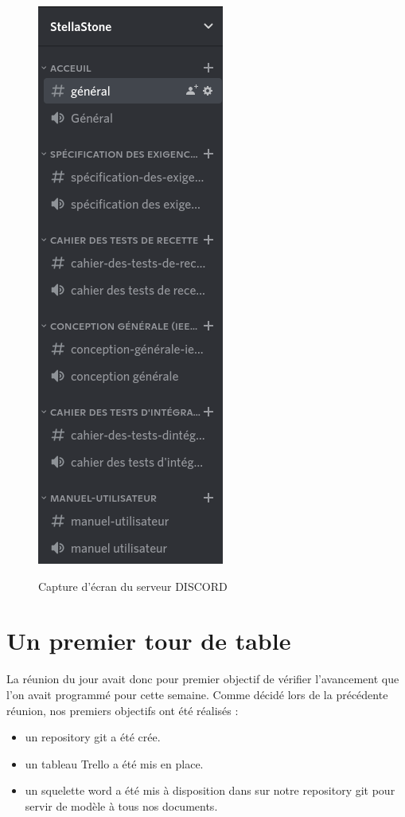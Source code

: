 \documentclass[a4paper, 12pt]{article}
\begin{document}
 \begin{figure}[!h]
    \centering
    \includegraphics[scale=0.5]{discord.png}
    \label{fig:Le_planning}
    \caption{Capture d'écran du serveur DISCORD}
\end{figure}

\section{Un premier tour de table}

La réunion du jour avait donc pour premier objectif de vérifier l'avancement que l'on avait programmé pour cette semaine. Comme décidé lors de la précédente réunion, nos premiers objectifs ont été réalisés : \\
\begin{itemize}
    \item un repository git a été crée.
    \item un tableau Trello a été mis en place.
    \item un squelette word a été mis à disposition dans sur notre repository git pour servir de modèle à tous nos documents.\\
\end{itemize}
\end{document}
